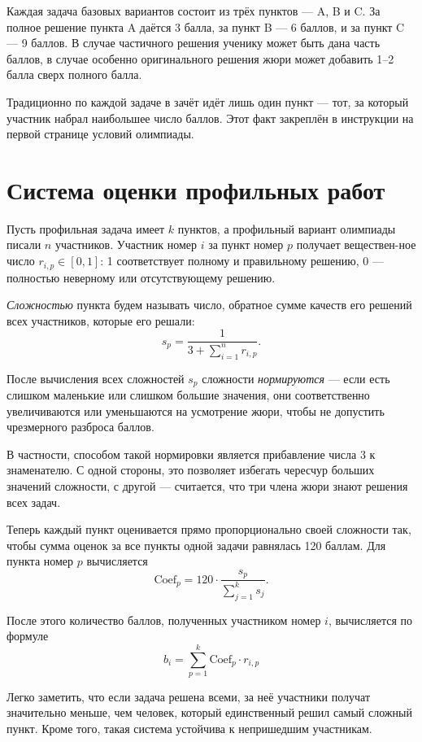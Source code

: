 \documentclass[a4paper,12pt]{article}
\begin{document}
Каждая задача базовых вариантов состоит из трёх пунктов — A, B и C. За полное решение пункта A даётся 3 балла, за пункт B --- 6 баллов, и за пункт C --- 9 баллов. В случае частичного решения ученику может быть дана часть баллов, в случае особенно оригинального решения жюри может добавить 1–2 балла сверх полного балла.

Традиционно по каждой задаче в зачёт идёт лишь один пункт — тот, за который участник набрал наибольшее число баллов. Этот факт закреплён в инструкции на первой странице условий олимпиады.

\section{Система оценки профильных работ}

Пусть профильная задача имеет $k$ пунктов, а профильный вариант олимпиады писали
$n$ участников. Участник номер $i$ за пункт номер $p$ получает веществен-\linebreak ное число
$r_{i,p} \in [0,1]$:
1 соответствует полному и правильному решению, 0 — полностью неверному или отсутствующему решению.

{\it Сложностью} пункта будем называть число, обратное сумме
качеств его решений всех участников, которые его решали:
	$$s_p = \frac{1}{3 + \sum\limits_{i=1}^n r_{i,p}}.$$

После вычисления всех сложностей $s_p$ сложности
{\it нормируются} — если есть слишком маленькие или слишком большие значения, они соответственно
увеличиваются или уменьшаются на усмотрение жюри, чтобы не допустить чрезмерного разброса баллов.

В частности, способом такой нормировки является прибавление числа 3 к знаменателю. С одной стороны,
это позволяет избегать чересчур больших значений сложности, с другой — считается, что три члена жюри
знают решения всех задач.

\def\Coef{\text{Coef}}
Теперь каждый пункт оценивается прямо пропорционально своей сложности так,
чтобы сумма оценок за все пункты одной задачи равнялась 120 баллам. Для пункта номер $p$ вычисляется
	$$\Coef_p = 120 \cdot \frac{s_p}{\sum\limits_{j=1}^{k} s_j}.$$

После этого количество баллов, полученных участником номер $i$, вычисляется по формуле
	$$b_i = \sum\limits_{p=1}^{k} \Coef_p \cdot r_{i,p}$$

Легко заметить, что если задача решена всеми, за неё участники получат значительно меньше, чем человек,
который единственный решил самый сложный пункт. Кроме того, такая система устойчива к непришедшим участникам.
\end{document}

